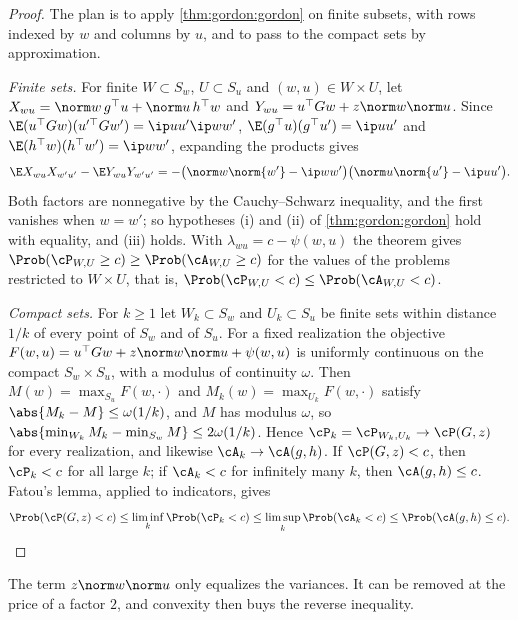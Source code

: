 \begin{refsection}
\begin{proof}
The plan is to apply \cref{thm:gordon:gordon} on finite subsets, with rows indexed by $w$ and columns by $u$, and to pass to the compact sets by approximation.

\emph{Finite sets.} For finite $W\subset S_w$, $U\subset S_u$ and $(w,u)\in W\times U$, let $X_{wu}=\norm w\,g^\top u+\norm u\,h^\top w$ and $Y_{wu}=u^\top Gw+z\norm w\norm u$. Since $\E(u^\top Gw)(u'^\top Gw')=\ip u{u'}\ip w{w'}$, $\E(g^\top u)(g^\top u')=\ip u{u'}$ and $\E(h^\top w)(h^\top w')=\ip w{w'}$, expanding the products gives
\[
\E X_{wu}X_{w'u'}-\E Y_{wu}Y_{w'u'}=-\bigl(\norm w\norm{w'}-\ip w{w'}\bigr)\bigl(\norm u\norm{u'}-\ip u{u'}\bigr).
\]
Both factors are nonnegative by the Cauchy--Schwarz inequality, and the first vanishes when $w=w'$; so hypotheses (i) and (ii) of \cref{thm:gordon:gordon} hold with equality, and (iii) holds. With $\lambda_{wu}=c-\psi(w,u)$ the theorem gives $\Prob(\cP_{W,U}\ge c)\ge\Prob(\cA_{W,U}\ge c)$ for the values of the problems restricted to $W\times U$, that is, $\Prob(\cP_{W,U}<c)\le\Prob(\cA_{W,U}<c)$.

\emph{Compact sets.} For $k\ge1$ let $W_k\subset S_w$ and $U_k\subset S_u$ be finite sets within distance $1/k$ of every point of $S_w$ and of $S_u$. For a fixed realization the objective $F(w,u)=u^\top Gw+z\norm w\norm u+\psi(w,u)$ is uniformly continuous on the compact $S_w\times S_u$, with a modulus of continuity $\omega$. Then $M(w)=\max_{S_u}F(w,\cdot)$ and $M_k(w)=\max_{U_k}F(w,\cdot)$ satisfy $\abs{M_k-M}\le\omega(1/k)$, and $M$ has modulus $\omega$, so $\abs{\min_{W_k}M_k-\min_{S_w}M}\le2\omega(1/k)$. Hence $\cP_k=\cP_{W_k,U_k}\to\cP(G,z)$ for every realization, and likewise $\cA_k\to\cA(g,h)$. If $\cP(G,z)<c$, then $\cP_k<c$ for all large $k$; if $\cA_k<c$ for infinitely many $k$, then $\cA(g,h)\le c$. Fatou's lemma, applied to indicators, gives
\[
\Prob(\cP(G,z)<c)\le\liminf_k\Prob(\cP_k<c)\le\limsup_k\Prob(\cA_k<c)\le\Prob(\cA(g,h)\le c).\qedhere
\]
\end{proof}

The term $z\norm w\norm u$ only equalizes the variances. It can be removed at the price of a factor $2$, and convexity then buys the reverse inequality.


\end{refsection}
